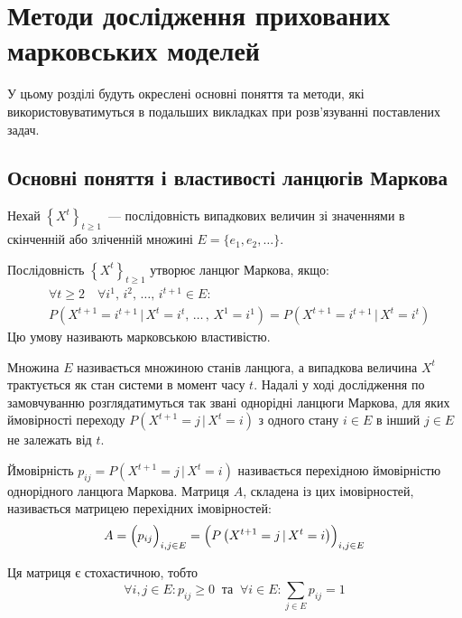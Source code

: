 
\chapter{Методи дослідження прихованих марковських моделей}
\label{chap: review}

У цьому розділі будуть окреслені основні поняття та методи, які використовуватимуться в подальших викладках при розв'язуванні поставлених задач.

\section{Основні поняття і властивості ланцюгів Маркова}

Нехай $\left\{ X^t \right\}_{t\geqslant 1}$~--- послідовність випадкових величин зі значеннями в скінченній або зліченній множині $E=\{ e_1,e_2,\ldots \}$. 

\begin{definition}
    Послідовність $\left\{ X^t \right\}_{t\geqslant 1}$ утворює ланцюг Маркова, якщо:
    \begin{align*}
        & \forall t\geqslant 2 \quad \forall i^1,\,i^2,\,\ldots,\,i^{t+1} \in E: \\
	    & P\left( X^{t+1}=i^{t+1} \, |\, X^t=i^t,\,\ldots\,,\, X^1=i^1 \right)=P\left( X^{t+1}=i^{t+1} \, |\, X^t=i^t \right)
    \end{align*}
    Цю умову називають марковською властивістю.
\end{definition}

Множина $E$ називається множиною станів ланцюга, а випадкова величина $X^t$ трактується як стан системи в момент часу $t$. Надалі у ході дослідження по замовчуванню розглядатимуться так звані однорідні ланцюги Маркова, для яких ймовірності переходу $P\left( X^{t+1}=j\,|\,X^{t}=i \right)$ з одного стану $i \in E$ в інший $j \in E$ не залежать від $t$.

Ймовірність $p_{ij} = P\left( X^{t+1}=j\,|\,X^{t}=i \right)$ називається перехідною ймовірністю однорідного ланцюга Маркова. Матриця $A$, складена із цих імовірностей, називається матрицею перехідних імовірностей:
\begin{equation*}
    A = \Bigl( p_{ij} \Bigr)_{i,j \in E} = \Bigl( P\left( X^{t+1}=j\,|\,X^{t}=i \right) \Bigr)_{i,j \in E}
\end{equation*} 

Ця матриця є стохастичною, тобто
\begin{equation*}
    \forall i,j \in E: p_{ij} \geqslant 0\ \text{ та }\ \forall i \in E: \sum\limits_{j \in E} p_{ij} = 1
\end{equation*}

